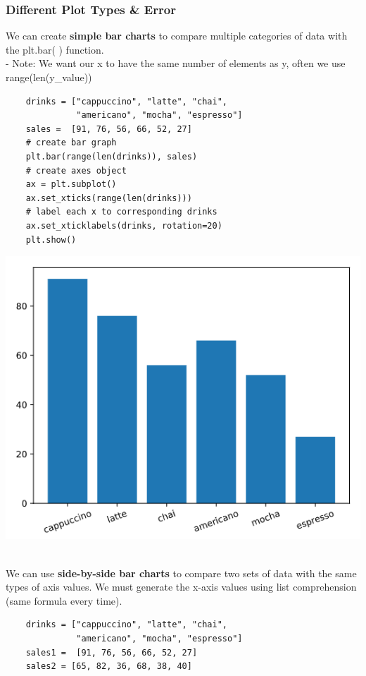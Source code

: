\documentclass[11pt, a4paper]{article}
\begin{document}
\begin{spacing}{1.1}
	\subsubsection{Different Plot Types \& Error}
	We can create \textbf{simple bar charts} to compare multiple categories of data with the plt.bar( ) function.\\
	\hspace*{3mm} - Note: We want our x to have the same number of elements as y, often we use range(len(y\_value))
	\begin{minipage}[c]{9cm}
	\begin{lstlisting}
	drinks = ["cappuccino", "latte", "chai", 
	          "americano", "mocha", "espresso"]
	sales =  [91, 76, 56, 66, 52, 27]
	# create bar graph
	plt.bar(range(len(drinks)), sales) 
	# create axes object
	ax = plt.subplot()
	ax.set_xticks(range(len(drinks)))
	# label each x to corresponding drinks
	ax.set_xticklabels(drinks, rotation=20)	
	plt.show() \end{lstlisting}\vspace*{1mm}
	\end{minipage}
	\begin{minipage}[c]{8cm}
		\includegraphics[scale=.5]{barchart}
	\end{minipage} \vspace*{1mm} \\
	We can use \textbf{side-by-side bar charts} to compare two sets of data with the same types of axis values. We must generate the x-axis values using list comprehension (same formula every time). \\
	\begin{minipage}[c]{9.2cm}
	\begin{lstlisting}
	drinks = ["cappuccino", "latte", "chai", 
	          "americano", "mocha", "espresso"]
	sales1 =  [91, 76, 56, 66, 52, 27]
	sales2 = [65, 82, 36, 68, 38, 40]
	

\end{lstlisting}
\end{minipage}
\end{spacing}
\end{document}
